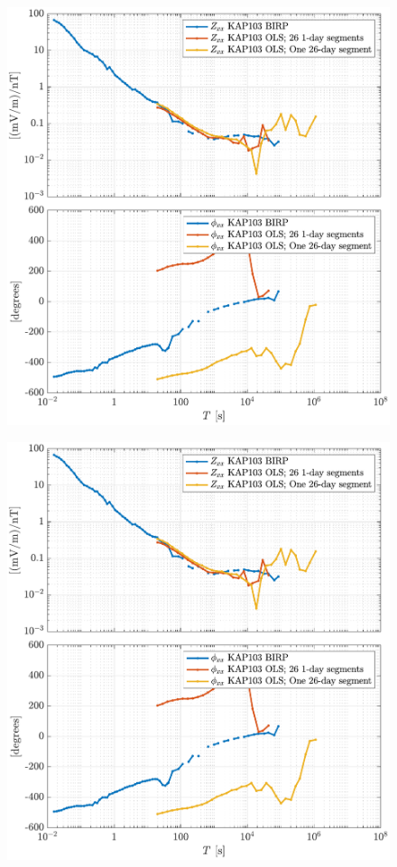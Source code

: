 \documentclass{article}
\begin{document}
\begin{figure}[h!]
\centering
\includegraphics[width=\textwidth]{figures/KAP103_Middelpos/transferfnZ_compare-Z_xx_Magnitude_Phase.pdf}
\caption{}
\label{fig:universe}
\end{figure}

\clearpage

\begin{figure}[h!]
\centering
\includegraphics[width=\textwidth]{figures/KAP103_Middelpos/transferfnZ_compare-Z_xx_Magnitude_Phase.pdf}
\caption{}
\label{fig:universe}
\end{figure}
\end{document}
